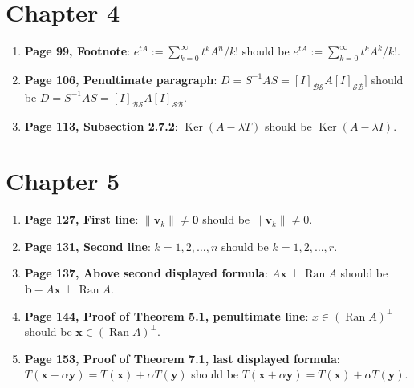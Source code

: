 \documentclass{article}
\begin{document}
\section*{Chapter 4}
\begin{enumerate}[leftmargin=*]
    \item \textbf{Page 99, Footnote}: 
          $e^{tA}:=\sum_{k=0}^{\infty}t^{k}A^{n}/k!$ should be 
          $e^{tA}:=\sum_{k=0}^{\infty}t^{k}A^{k}/k!$.
    
    \item \textbf{Page 106, Penultimate paragraph}: 
          $D=S^{-1}AS=[I]_\mathcal{BS}A[I]_\mathcal{SB}]$ should be 
          $D=S^{-1}AS=[I]_\mathcal{BS}A[I]_\mathcal{SB}$. 
    
    \item \textbf{Page 113, Subsection 2.7.2}: 
          $\operatorname{Ker} (A-\lambda T)$ should be $\operatorname{Ker} (A-\lambda I)$.
\end{enumerate}

\section*{Chapter 5}
\begin{enumerate}[leftmargin=*]
    \item \textbf{Page 127, First line}: 
          $\|\mathbf{v}_k\|\ne\mathbf{0}$ should be $\|\mathbf{v}_k\|\ne0$.
    
    \item \textbf{Page 131, Second line}: 
          $k=1,2,\dots,n$ should be $k=1,2,\dots,r$.
    
    \item \textbf{Page 137, Above second displayed formula}: 
          $A\mathbf{x}\perp\operatorname{Ran} A$ should be $\mathbf{b}-A\mathbf{x}\perp\operatorname{Ran} A$.
    
    \item \textbf{Page 144, Proof of Theorem 5.1, penultimate line}: 
          ${x}\in(\operatorname{Ran} A)^\perp$ should be $\mathbf{x}\in(\operatorname{Ran} A)^\perp$.
    
    \item \textbf{Page 153, Proof of Theorem 7.1, last displayed formula}: 
          $T(\mathbf{x}-\alpha\mathbf{y})=T(\mathbf{x})+\alpha T(\mathbf{y})$ should be 
          $T(\mathbf{x}+\alpha\mathbf{y})=T(\mathbf{x})+\alpha T(\mathbf{y})$.
\end{enumerate}
\end{document}
